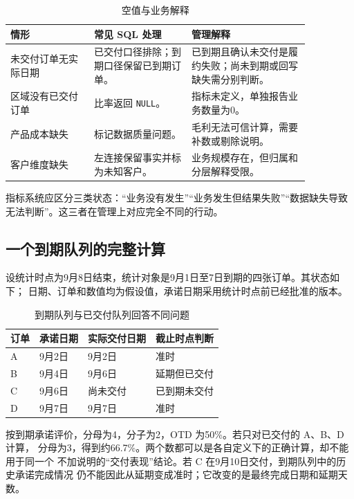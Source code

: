 \begin{table}[htbp]
\centering
\caption{空值与业务解释}
\begin{tabular}{P{0.24\linewidth}P{0.28\linewidth}P{0.34\linewidth}}
\toprule
{}
情形 & 常见 SQL 处理 & 管理解释\\
\midrule
未交付订单无实际日期 & 已交付口径排除；到期口径保留已到期订单。 & 已到期且确认未交付是履约失败；尚未到期或回写缺失需分别判断。\\
区域没有已交付订单 & 比率返回 \texttt{NULL}。 & 指标未定义，单独报告业务数量为0。\\
产品成本缺失 & 标记数据质量问题。 & 毛利无法可信计算，需要补数或剔除说明。\\
客户维度缺失 & 左连接保留事实并标为未知客户。 & 业务规模存在，但归属和分层解释受限。\\
\bottomrule
\end{tabular}
\end{table}

\begin{remark}
指标系统应区分三类状态：“业务没有发生”“业务发生但结果失败”“数据缺失导致无法判断”。这三者在管理上对应完全不同的行动。
\end{remark}

\subsection{一个到期队列的完整计算}
\label{sec:due-cohort-example}
设统计时点为9月8日结束，统计对象是9月1日至7日到期的四张订单。其状态如下；
日期、订单和数值均为假设值，承诺日期采用统计时点前已经批准的版本。
\begin{table}[htbp]
\centering
\caption{到期队列与已交付队列回答不同问题}
\label{tab:due-cohort}
\begin{tabular}{llll}
\toprule
\rowcolor{BDMTableHead}
订单 & 承诺日期 & 实际交付日期 & 截止时点判断\\
\midrule
A & 9月2日 & 9月2日 & 准时\\
B & 9月4日 & 9月6日 & 延期但已交付\\
C & 9月6日 & 尚未交付 & 已到期未交付\\
D & 9月7日 & 9月7日 & 准时\\
\bottomrule
\end{tabular}
\end{table}

按到期承诺评价，分母为4，分子为2，OTD 为50\%。若只对已交付的 A、B、D 计算，
分母为3，得到约66.7\%。两个数都可以是各自定义下的正确计算，却不能用于同一个
不加说明的“交付表现”结论。若 C 在9月10日交付，到期队列中的历史承诺完成情况
仍不能因此从延期变成准时；它改变的是最终完成日期和延期天数。

